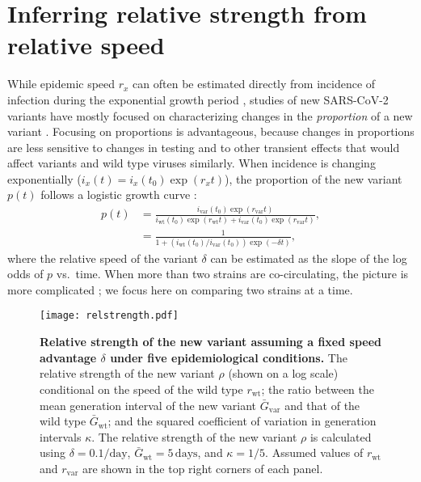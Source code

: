 \documentclass[12pt]{article}
\newcommand{\vvvar}{\mathrm{var}}
\newcommand{\wwwt}{\mathrm{wt}}
\newcommand{\rx}[1]{\ensuremath{{r}_{#1}}\xspace}
\newcommand{\rw}{\rx{\wwwt}}
\newcommand{\rv}{\rx{\vvvar}}
\newcommand{\days}{\ensuremath{\, \textrm{days}}}
\newcommand{\pday}{\ensuremath{/\textrm{day}}}
\newcommand{\ix}[1]{\ensuremath{{i}_{#1}}\xspace}
\newcommand{\iw}{\ix{\wwwt}}
\newcommand{\iv}{\ix{\vvvar}}
\newcommand{\Gx}[1]{\ensuremath{{\bar G}_{#1}}\xspace}
\newcommand{\Gw}{\Gx{\wwwt}}
\newcommand{\Gv}{\Gx{\vvvar}}
\begin{document}
\section{Inferring relative strength from relative speed}

While epidemic speed $r_x$ can often be estimated directly from incidence of infection during the exponential growth period \citep{mills2004transmissibility,nishiura2009transmission,ma2014estimating},
studies of new SARS-CoV-2 variants have mostly focused on characterizing changes in the \emph{proportion} of a new variant \citep{switzerland2021variant, davies2021estimated, di2021impact, graham2021changes, leung2021early, volz2021transmission,zhao2021}.
Focusing on proportions is advantageous, because changes in proportions are less sensitive to changes in testing and to other transient effects that would affect variants and wild type viruses similarly.
When incidence is changing exponentially ($i_x(t) = i_x(t_0) \exp(r_x t)$), the proportion of the new variant $p(t)$ follows a logistic growth curve \citep{switzerland2021variant,davies2021estimated}:
\begin{align}
p(t) &= \frac{\iv(t_0) \exp(\rv t)}{\iw(t_0) \exp(\rw t) + \iv(t_0) \exp(\rv t)},
\\ &= \frac{1}{1 + \left(\iw(t_0)/\iv(t_0)\right) \exp(-\delta t)},
\end{align}
where the relative speed of the variant $\delta$ can be estimated as the slope of the log odds of $p$  vs.~time.
When more than two strains are co-circulating, the picture is more complicated \citep{campbell2021increased}; we focus here on comparing two strains at a time.

\begin{figure}[!t]
\texttt{[image: relstrength.pdf]}
\caption{
\textbf{Relative strength of the new variant assuming a fixed speed advantage $\delta$ under five epidemiological conditions.}
The relative strength of the new variant $\rho$ (shown on a log scale) conditional on the speed of the wild type $\rw$; the ratio between the mean generation interval of the new variant $\Gv$ and that of the wild type $\Gw$; and the squared coefficient of variation in generation intervals $\kappa$.
The relative strength of the new variant $\rho$ is calculated using $\delta=0.1\pday$, $\Gw = 5\days$, and $\kappa = 1/5$.
Assumed values of $\rw$ and $\rv$ are shown in the top right corners of each panel.
}
\label{fig:relstrength}
\end{figure}
\end{document}
